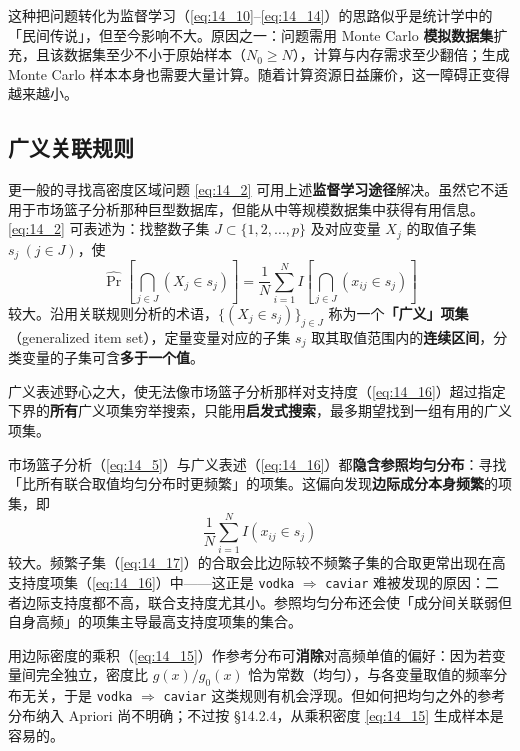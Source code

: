 \begin{remark}[此法为何未被重视]
这种把问题转化为监督学习（\eqref{eq:14_10}--\eqref{eq:14_14}）的思路似乎是统计学中的「民间传说」，但至今影响不大。原因之一：问题需用 Monte Carlo \textbf{模拟数据集}扩充，且该数据集至少不小于原始样本（$N_0\ge N$），计算与内存需求至少翻倍；生成 Monte Carlo 样本本身也需要大量计算。随着计算资源日益廉价，这一障碍正变得越来越小。
\end{remark}

\subsection{广义关联规则}

更一般的寻找高密度区域问题 \eqref{eq:14_2} 可用上述\textbf{监督学习途径}解决。虽然它不适用于市场篮子分析那种巨型数据库，但能从中等规模数据集中获得有用信息。\eqref{eq:14_2} 可表述为：找整数子集 $J\subset\{1,2,\dots,p\}$ 及对应变量 $X_j$ 的取值子集 $s_j\ (j\in J)$，使
\begin{equation}
\hat\Pr\left[\bigcap_{j\in J} (X_j\in s_j)\right] = \frac{1}{N}\sum_{i=1}^{N} I\left[\bigcap_{j\in J} (x_{ij}\in s_j)\right] \label{eq:14_16}
\end{equation}
较大。沿用关联规则分析的术语，$\{(X_j\in s_j)\}_{j\in J}$ 称为一个\textbf{「广义」项集}（generalized item set），定量变量对应的子集 $s_j$ 取其取值范围内的\textbf{连续区间}，分类变量的子集可含\textbf{多于一个值}。

广义表述野心之大，使无法像市场篮子分析那样对支持度（\eqref{eq:14_16}）超过指定下界的\textbf{所有}广义项集穷举搜索，只能用\textbf{启发式搜索}，最多期望找到一组有用的广义项集。

\begin{remark}[均匀分布的隐含偏好]
市场篮子分析（\eqref{eq:14_5}）与广义表述（\eqref{eq:14_16}）都\textbf{隐含参照均匀分布}：寻找「比所有联合取值均匀分布时更频繁」的项集。这偏向发现\textbf{边际成分本身频繁}的项集，即
\begin{equation}
\frac{1}{N}\sum_{i=1}^{N} I(x_{ij}\in s_j) \label{eq:14_17}
\end{equation}
较大。频繁子集（\eqref{eq:14_17}）的合取会比边际较不频繁子集的合取更常出现在高支持度项集（\eqref{eq:14_16}）中——这正是 \texttt{vodka} $\Rightarrow$ \texttt{caviar} 难被发现的原因：二者边际支持度都不高，联合支持度尤其小。参照均匀分布还会使「成分间关联弱但自身高频」的项集主导最高支持度项集的集合。

用边际密度的乘积（\eqref{eq:14_15}）作参考分布可\textbf{消除}对高频单值的偏好：因为若变量间完全独立，密度比 $g(x)/g_0(x)$ 恰为常数（均匀），与各变量取值的频率分布无关，于是 \texttt{vodka} $\Rightarrow$ \texttt{caviar} 这类规则有机会浮现。但如何把均匀之外的参考分布纳入 Apriori 尚不明确；不过按 §14.2.4，从乘积密度 \eqref{eq:14_15} 生成样本是容易的。
\end{remark}

